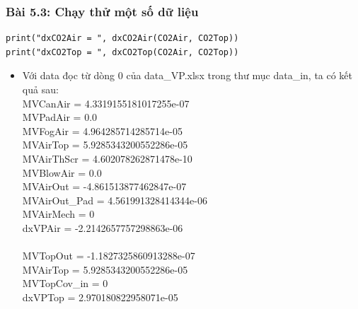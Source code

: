 \documentclass[a4paper]{article}
\begin{document}
\subsubsection{Bài 5.3: Chạy thử một số dữ liệu}
\begin{verbatim}
print("dxCO2Air = ", dxCO2Air(CO2Air, CO2Top))
print("dxCO2Top = ", dxCO2Top(CO2Air, CO2Top))
\end{verbatim}
\begin{itemize}
    \item Với data đọc từ dòng $0$ của data\_VP.xlsx trong thư mục data\_in, ta có kết quả sau:\\
    MVCanAir =  4.3319155181017255e-07\\
    MVPadAir =  0.0\\
    MVFogAir =  4.964285714285714e-05\\
    MVAirTop =  5.9285343200552286e-05\\
    MVAirThScr =  4.602078262871478e-10\\
    MVBlowAir =  0.0\\
    MVAirOut =  -4.861513877462847e-07\\
    MVAirOut\_Pad =  4.561991328414344e-06\\
    MVAirMech =  0\\
    dxVPAir =  -2.2142657757298863e-06\\\\
    MVTopOut =  -1.1827325860913288e-07\\
    MVAirTop =  5.9285343200552286e-05\\
    MVTopCov\_in =  0\\
    dxVPTop =  2.970180822958071e-05
\end{itemize}
\end{document}
